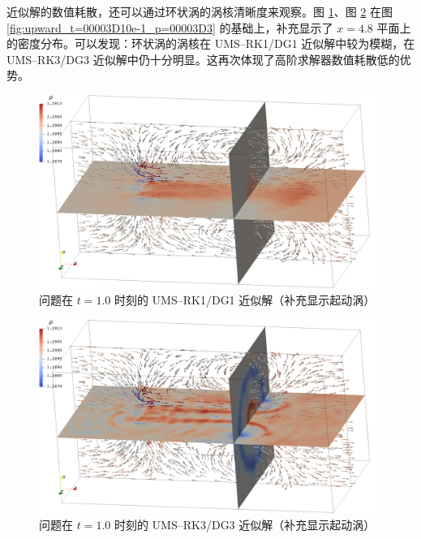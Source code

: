 近似解的数值耗散，还可以通过环状涡的涡核清晰度来观察。图 \ref{fig:upward_p=00003D1}、图 \ref{fig:upward_p=00003D3}
在图 \ref{fig:upward_t=00003D10e-1_p=00003D3} 的基础上，补充显示了 $x=4.8$ 平面上的密度分布。可以发现：环状涡的涡核在
UMS–RK1/DG1 近似解中较为模糊，在 UMS–RK3/DG3 近似解中仍十分明显。这再次体现了高阶求解器数值耗散低的优势。

\begin{figure}[h!]
\begin{centering}
\includegraphics[width=1\textwidth,height=0.26\textheight,keepaspectratio]{../mdpi/figures/rotor_in_tunnel/upward_p=1}
\par\end{centering}
\caption{\label{fig:upward_p=00003D1}问题在
$t=1.0$ 时刻的 UMS–RK1/DG1 近似解（补充显示起动涡）}
\end{figure}

\begin{figure}[h!]
\begin{centering}
\includegraphics[width=1\textwidth,height=0.26\textheight,keepaspectratio]{../mdpi/figures/rotor_in_tunnel/upward_p=3}
\par\end{centering}
\caption{\label{fig:upward_p=00003D3}问题在
$t=1.0$ 时刻的 UMS–RK3/DG3 近似解（补充显示起动涡）}
\end{figure}

